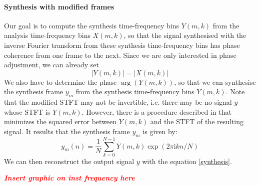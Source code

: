 \documentclass[letterpaper]{article}
\newcommand{\TODO}[1]{\textcolor{red}{\textbf{\textit{\huge #1}}}}
\theoremstyle{definition}
\theoremstyle{remark}
\theoremstyle{plain}
\begin{document}
\paragraph{Synthesis with modified frames}
Our goal is to compute the synthesis time-frequency bins \(Y(m,k)\) from the
analysis time-frequency bins \(X(m,k)\), so that the signal synthesised with the
inverse Fourier transform from these synthesis time-frequency bins has phase
coherence from one frame to the next. Since we are only interested in phase
adjustment, we can already set
\begin{equation}
    |Y(m,k)| = |X(m,k)|
\end{equation}
We also have to determine the phase \(\arg(Y(m,k))\), so that we can synthesise
the synthesis frame \(y_m\) from the synthesis time-frequency bins \(Y(m,k)\).
Note that the modified STFT may not be invertible, i.e. there may be no signal
\(y\) whose STFT is \(Y(m,k)\). However, there is a procedure described in
\citep{signalEstim} that minimizes the squared error between \(Y(m,k)\) and the
STFT of the resulting signal. It results that the synthesis frame \(y_m\) is
given by:
\begin{equation}
		\label{modified_synth}
		y_m(n)=\frac{1}{N}\sum_{k=0}^{N-1}Y(m,k)\exp(2\pi\text{i}kn/N)
\end{equation}
We can then reconstruct the output signal \(y\) with the equation
\eqref{synthesis}.

\TODO{Insert graphic on inst frequency here}
\end{document}
